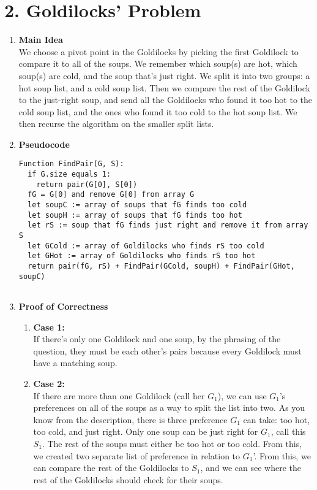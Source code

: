 \documentclass[11pt]{article}
\newenvironment{qparts}{\begin{enumerate}[{(}a{)}]}{\end{enumerate}}
\begin{document}
\newpage
\section*{2. Goldilocks' Problem }
\begin{qparts}
	\item[] \textbf{Main Idea} \\
		We choose a pivot point in the Goldilocks by picking the first Goldilock to compare it to all of the soups. We remember which soup(s) are hot, which soup(s) are cold, and the soup that's just right. We split it into two groups: a hot soup list, and a cold soup list. Then we compare the rest of the Goldilock to the just-right soup, and send all the Goldilocks who found it too hot to the cold soup list, and the ones who found it too cold to the hot soup list. We then recurse the algorithm on the smaller split lists. 
	\item[] \textbf{Pseudocode} \\
		\begin{minipage}{\linewidth}
		\begin{lstlisting}
Function FindPair(G, S):
  if G.size equals 1:
    return pair(G[0], S[0])
  fG = G[0] and remove G[0] from array G
  let soupC := array of soups that fG finds too cold
  let soupH := array of soups that fG finds too hot
  let rS := soup that fG finds just right and remove it from array S
  let GCold := array of Goldilocks who finds rS too cold
  let GHot := array of Goldilocks who finds rS too hot
  return pair(fG, rS) + FindPair(GCold, soupH) + FindPair(GHot, soupC)
  
		\end{lstlisting}
		\end{minipage}
		
	\item[] \textbf{Proof of Correctness} 
	\begin{qparts}
		\item[] \textbf{Case 1:} \\
		If there's only one Goldilock and one soup, by the phrasing of the question, they must be each other's pairs because every Goldilock must have a matching soup.  
		\item[] \textbf{Case 2:} \\
		If there are more than one Goldilock (call her $G_1$), we can use $G_1$'s preferences on all of the soups as a way to split the list into two. As you know from the description, there is three preference $G_1$ can take: too hot, too cold, and just right. Only one soup can be just right for $G_1$, call this $S_1$. The rest of the soups must either be too hot or too cold. From this, we created two separate list of preference in relation to $G_1$'. From this, we can compare the rest of the Goldilocks to $S_1$, and we can see where the rest of the Goldilocks should check for their soups. 
		

\end{qparts}
\end{qparts}
\end{document}
